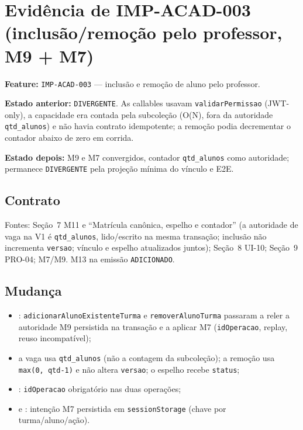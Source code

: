 \section{Evidência de IMP-ACAD-003 (inclusão/remoção pelo professor, M9 + M7)}

\textbf{Feature:} \texttt{IMP-ACAD-003} --- inclusão e remoção de aluno pelo
professor.

\textbf{Estado anterior:} \texttt{DIVERGENTE}. As callables usavam
\texttt{validarPermissao} (JWT-only), a capacidade era contada pela subcoleção
(O(N), fora da autoridade \texttt{qtd\_alunos}) e não havia contrato idempotente;
a remoção podia decrementar o contador abaixo de zero em corrida.

\textbf{Estado depois:} M9 e M7 convergidos, contador \texttt{qtd\_alunos} como
autoridade; permanece \texttt{DIVERGENTE} pela projeção mínima do vínculo e E2E.

\subsection{Contrato}

Fontes: Seção~7 M11 e ``Matrícula canônica, espelho e contador'' (a autoridade
de vaga na V1 é \texttt{qtd\_alunos}, lido/escrito na mesma transação; inclusão
não incrementa \texttt{versao}; vínculo e espelho atualizados juntos); Seção~8
UI-10; Seção~9 PRO-04; M7/M9. M13 na emissão \texttt{ADICIONADO}.

\subsection{Mudança}

\begin{itemize}
  \item {}: \texttt{adicionarAlunoExistenteTurma} e
  \texttt{removerAlunoTurma} passaram a reler a autoridade M9 persistida na
  transação e a aplicar M7 (\texttt{idOperacao}, replay, reuso incompatível);
  \item a vaga usa \texttt{qtd\_alunos} (não a contagem da subcoleção); a
  remoção usa \texttt{max(0, qtd-1)} e não altera \texttt{versao}; o espelho
  recebe \texttt{status};
  \item {}: \texttt{idOperacao}
  obrigatório nas duas operações;
  \item {} e
  : intenção M7 persistida em
  \texttt{sessionStorage} (chave por turma/aluno/ação).
\end{itemize}

